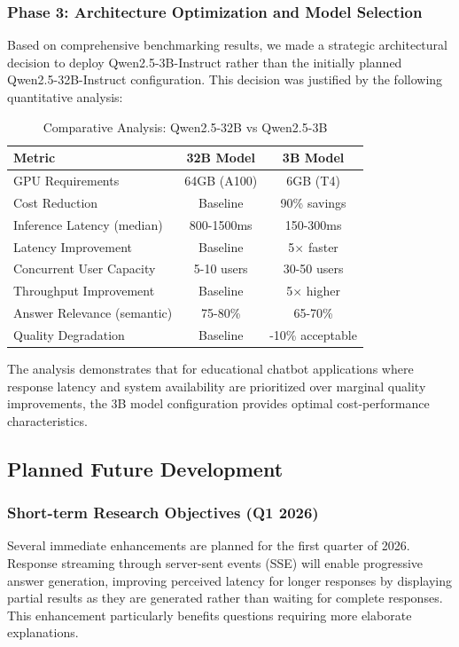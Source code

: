 \documentclass[12pt,a4paper]{article}
\begin{document}
\subsubsection{Phase 3: Architecture Optimization and Model Selection}

Based on comprehensive benchmarking results, we made a strategic architectural decision to deploy Qwen2.5-3B-Instruct rather than the initially planned Qwen2.5-32B-Instruct configuration. This decision was justified by the following quantitative analysis:

\begin{table}[H]
\centering
\caption{Comparative Analysis: Qwen2.5-32B vs Qwen2.5-3B}
\begin{tabular}{lcc}
\toprule
\textbf{Metric} & \textbf{32B Model} & \textbf{3B Model} \\
\midrule
GPU Requirements & 64GB (A100) & 6GB (T4) \\
Cost Reduction & Baseline & 90\% savings \\
Inference Latency (median) & 800-1500ms & 150-300ms \\
Latency Improvement & Baseline & 5$\times$ faster \\
Concurrent User Capacity & 5-10 users & 30-50 users \\
Throughput Improvement & Baseline & 5$\times$ higher \\
Answer Relevance (semantic) & 75-80\% & 65-70\% \\
Quality Degradation & Baseline & -10\% acceptable \\
\bottomrule
\end{tabular}
\end{table}

The analysis demonstrates that for educational chatbot applications where response latency and system availability are prioritized over marginal quality improvements, the 3B model configuration provides optimal cost-performance characteristics.

\subsection{Planned Future Development}

\subsubsection{Short-term Research Objectives (Q1 2026)}

Several immediate enhancements are planned for the first quarter of 2026. Response streaming through server-sent events (SSE) will enable progressive answer generation, improving perceived latency for longer responses by displaying partial results as they are generated rather than waiting for complete responses. This enhancement particularly benefits questions requiring more elaborate explanations.
\end{document}
